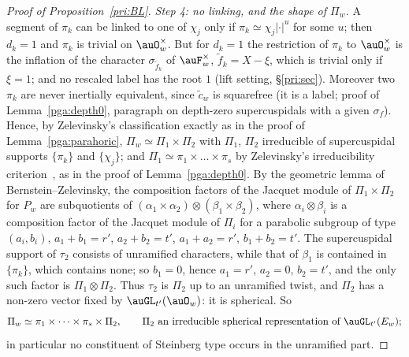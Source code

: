 \documentclass[10pt]{amsart}
\theoremstyle{definition}
\theoremstyle{remark}
\begin{document}
\begin{proof}[Proof of Proposition~\ref{pri:BL}]
\emph{Step 4: no linking, and the shape of $\Pi_w$.} A segment of $\pi_k$ can be linked to one of
$\chi_j$ only if $\pi_k\simeq\chi_j|\cdot|^u$ for some $u$; then $d_k=1$ and $\pi_k$ is trivial on
$\auO_w^\times$. But for $d_k=1$ the restriction of $\pi_k$ to $\auO_w^\times$ is the inflation of the
character $\sigma_{\tilde f_k}$ of $\auF_w^\times$, $\tilde f_k=X-\xi$, which is trivial only if
$\xi=1$; and no rescaled label has the root $1$ (lift setting, \S\ref{pri:sec}). Moreover two
$\pi_k$ are never inertially equivalent, since $\tilde c_w$ is squarefree (it is a label; proof of
Lemma~\ref{pga:depth0}, paragraph on depth-zero supercuspidals with a given $\sigma_f$). Hence, by
Zelevinsky's classification exactly as in the proof of Lemma~\ref{pga:parahoric},
$\Pi_w\simeq\Pi_1\times\Pi_2$ with $\Pi_1$, $\Pi_2$ irreducible of supercuspidal supports
$\{\pi_k\}$ and $\{\chi_j\}$; and $\Pi_1\simeq\pi_1\times\dots\times\pi_s$ by Zelevinsky's
irreducibility criterion~\cite[Theorem~4.2]{Zelevinsky}, as in the proof of Lemma~\ref{pga:depth0}.
By the geometric lemma of Bernstein--Zelevinsky, the composition factors of the Jacquet module of
$\Pi_1\times\Pi_2$ for $P_w$ are subquotients of $(\alpha_1\times\alpha_2)\otimes(\beta_1\times\beta_2)$,
where $\alpha_i\otimes\beta_i$ is a composition factor of the Jacquet module of $\Pi_i$ for a parabolic
subgroup of type $(a_i,b_i)$, $a_1+b_1=r'$, $a_2+b_2=t'$, $a_1+a_2=r'$, $b_1+b_2=t'$. The supercuspidal
support of $\tau_2$ consists of unramified characters, while that of $\beta_1$ is contained in
$\{\pi_k\}$, which contains none; so $b_1=0$, hence $a_1=r'$, $a_2=0$, $b_2=t'$, and the only such
factor is $\Pi_1\otimes\Pi_2$. Thus $\tau_2$ is $\Pi_2$ up to an unramified twist, and $\Pi_2$ has a
non-zero vector fixed by $\auGL_{t'}(\auO_w)$: it is spherical. So
\[
\Pi_w\simeq\pi_1\times\dots\times\pi_s\times\Pi_2,\qquad\Pi_2\ \text{an irreducible spherical
representation of }\auGL_{t'}(E_w);
\]
in particular no constituent of Steinberg type occurs in the unramified part.


\end{proof}
\end{document}
